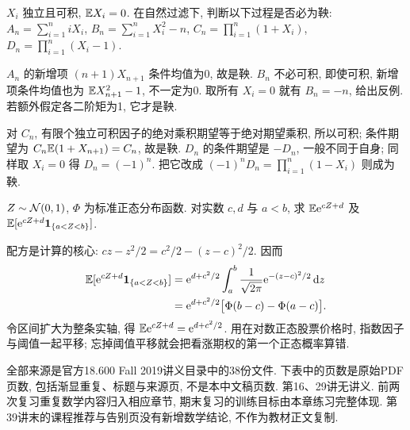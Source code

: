 \begin{exercise}
$X_i$ 独立且可积, $\mathbb E X_i=0$. 在自然过滤下, 判断以下过程是否必为鞅:
$A_n=\sum_{i=1}^n iX_i$,
$B_n=\sum_{i=1}^nX_i^2-n$,
$C_n=\prod_{i=1}^n(1+X_i)$,
$D_n=\prod_{i=1}^n(X_i-1)$.
\end{exercise}
\begin{solution}
$A_n$ 的新增项 $(n+1)X_{n+1}$ 条件均值为0, 故是鞅. $B_n$ 不必可积, 即使可积, 新增项条件均值也为 $\mathbb E X_{n+1}^2-1$, 不一定为0. 取所有 $X_i=0$ 就有 $B_n=-n$, 给出反例. 若额外假定各二阶矩为1, 它才是鞅.

对 $C_n$, 有限个独立可积因子的绝对乘积期望等于绝对期望乘积, 所以可积; 条件期望为 $C_n\mathbb E(1+X_{n+1})=C_n$, 故是鞅. $D_n$ 的条件期望是 $-D_n$, 一般不同于自身; 同样取 $X_i=0$ 得 $D_n=(-1)^n$. 把它改成 $(-1)^nD_n=\prod_{i=1}^n(1-X_i)$ 则成为鞅.
\end{solution}

\begin{exercise}
$Z\sim\mathcal N(0,1)$, $\Phi$ 为标准正态分布函数. 对实数 $c,d$ 与 $a<b$, 求 $\mathbb E\mathrm e^{cZ+d}$ 及 $\mathbb E[\mathrm e^{cZ+d}\mathbf 1_{\{a<Z<b\}}]$.
\end{exercise}
\begin{solution}
配方是计算的核心: $cz-z^2/2=c^2/2-(z-c)^2/2$. 因而
\[
\begin{aligned}
\mathbb E[\mathrm e^{cZ+d}\mathbf 1_{\{a<Z<b\}}]
&=\mathrm e^{d+c^2/2}\int_a^b\frac1{\sqrt{2\pi}}\mathrm e^{-(z-c)^2/2}\,\mathrm d z\\
&=\mathrm e^{d+c^2/2}\bigl[\Phi(b-c)-\Phi(a-c)\bigr].
\end{aligned}
\]
令区间扩大为整条实轴, 得 $\mathbb E\mathrm e^{cZ+d}=\mathrm e^{d+c^2/2}$. 用在对数正态股票价格时, 指数因子与阈值一起平移; 忘掉阈值平移就会把看涨期权的第一个正态概率算错.
\end{solution}

全部来源是官方18.600 Fall 2019讲义目录中的38份文件. 下表中的页数是原始PDF页数, 包括渐显重复、标题与来源页, 不是本中文稿页数. 第16、29讲无讲义. 前两次复习重复数学内容归入相应章节, 期末复习的训练目标由本章练习完整体现. 第39讲末的课程推荐与告别页没有新增数学结论, 不作为教材正文复制.

